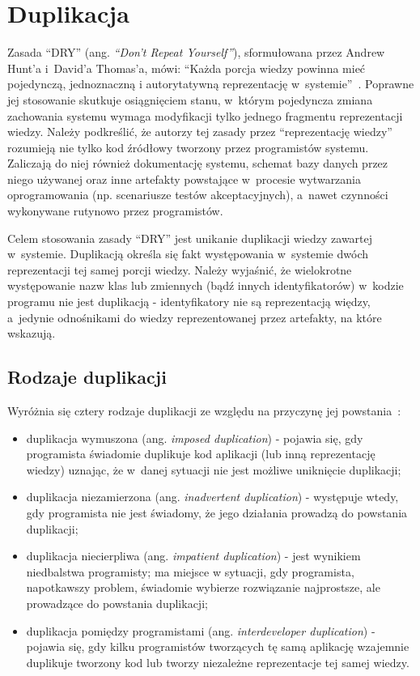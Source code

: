\chapter{Duplikacja} \label{chap:duplication}

Zasada ``DRY'' (ang. \emph{``Don't Repeat Yourself''}), sformułowana przez Andrew Hunt'a i~David'a Thomas'a, mówi: ``Każda porcja wiedzy powinna mieć pojedynczą, jednoznaczną i autorytatywną reprezentację w~systemie''~\cite{prag_prog:dupl}.
Poprawne jej stosowanie skutkuje osiągnięciem stanu, w~którym pojedyncza zmiana zachowania systemu wymaga modyfikacji tylko jednego fragmentu reprezentacji wiedzy.
Należy podkreślić, że autorzy tej zasady przez ``reprezentację wiedzy'' rozumieją nie tylko kod źródłowy tworzony przez programistów systemu.
Zaliczają do niej również dokumentację systemu, schemat bazy danych przez niego używanej oraz inne artefakty powstające w~procesie wytwarzania oprogramowania (np. scenariusze testów akceptacyjnych), a~nawet czynności wykonywane rutynowo przez programistów.

Celem stosowania zasady ``DRY'' jest unikanie duplikacji wiedzy zawartej w~systemie.
Duplikacją określa się fakt występowania w~systemie dwóch reprezentacji tej samej porcji wiedzy.
Należy wyjaśnić, że wielokrotne występowanie nazw klas lub zmiennych (bądź innych identyfikatorów) w~kodzie programu nie jest duplikacją - identyfikatory nie są reprezentacją więdzy, a~jedynie odnośnikami do wiedzy reprezentowanej przez artefakty, na które wskazują.



\section{Rodzaje duplikacji} \label{sec:dupl_kinds}

Wyróżnia się cztery rodzaje duplikacji ze względu na przyczynę jej powstania~\cite{prag_prog:dupl}:

\begin{itemize}
 \item duplikacja wymuszona (ang. \emph{imposed duplication}) - pojawia się, gdy programista świadomie duplikuje kod aplikacji (lub inną reprezentację wiedzy) uznając, że w~danej sytuacji nie jest możliwe uniknięcie duplikacji;
 \item duplikacja niezamierzona (ang. \emph{inadvertent duplication}) - występuje wtedy, gdy programista nie jest świadomy, że jego działania prowadzą do powstania duplikacji;
 \item duplikacja niecierpliwa (ang. \emph{impatient duplication}) - jest wynikiem niedbalstwa programisty; ma miejsce w sytuacji, gdy programista, napotkawszy problem, świadomie wybierze rozwiązanie najprostsze, ale prowadzące do powstania duplikacji;
 \item duplikacja pomiędzy programistami (ang. \emph{interdeveloper duplication}) - pojawia się, gdy kilku programistów tworzących tę samą aplikację wzajemnie duplikuje tworzony kod lub tworzy niezależne reprezentacje tej samej wiedzy.
\end{itemize}

